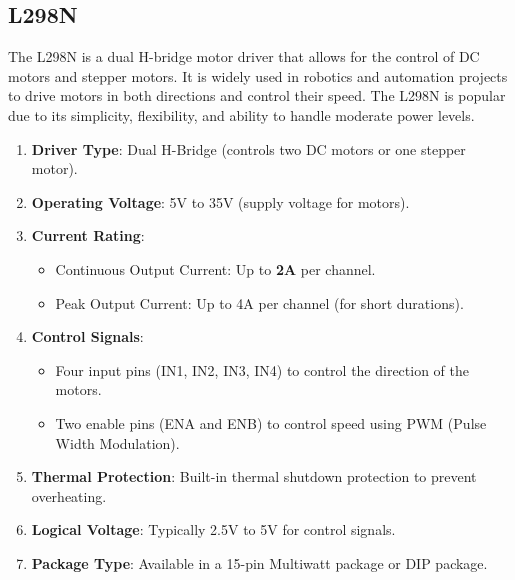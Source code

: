 \subsection{\fontsize{14}{16} L298N}
{
	\fontsize{12}{14}
	The L298N is a dual H-bridge motor driver that allows for the control of DC motors and stepper motors. It is widely used in robotics and automation projects to drive motors in both directions and control their speed. The L298N is popular due to its simplicity, flexibility, and ability to handle moderate power levels.
	\begin{enumerate}
		\item \textbf{Driver Type}: Dual H-Bridge (controls two DC motors or one stepper motor).
		
		\item \textbf{Operating Voltage}: 5V to 35V (supply voltage for motors).

		\item \textbf{Current Rating}: 
		\begin{itemize}
			\item Continuous Output Current: Up to \textbf{2A} per channel. 
			\item Peak Output Current: Up to 4A per channel (for short durations).
		\end{itemize}
		
		\item \textbf{Control Signals}: 
		\begin{itemize}
			\item Four input pins (IN1, IN2, IN3, IN4) to control the direction of the motors.
			\item Two enable pins (ENA and ENB) to control speed using PWM (Pulse Width Modulation).
		\end{itemize}
		
		\item \textbf{Thermal Protection}: Built-in thermal shutdown protection to prevent overheating.
		
		\item \textbf{Logical Voltage}: Typically 2.5V to 5V for control signals.
		
		\item \textbf{Package Type}: Available in a 15-pin Multiwatt package or DIP package.

	\end{enumerate}
	
}
